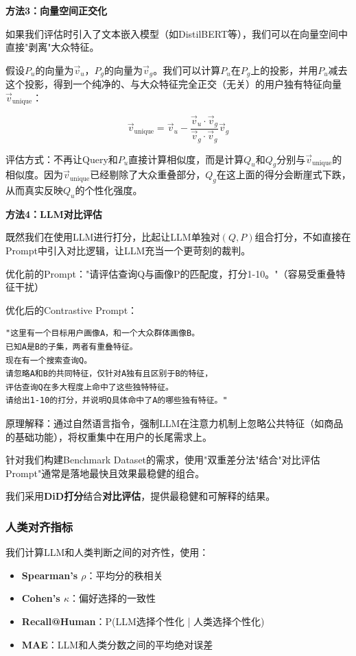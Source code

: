 \documentclass[11pt,a4paper]{article}
\begin{document}
\textbf{方法3：向量空间正交化}

如果我们评估时引入了文本嵌入模型（如DistilBERT等），我们可以在向量空间中直接"剥离"大众特征。

假设$P_u$的向量为$\vec{v}_u$，$P_g$的向量为$\vec{v}_g$。我们可以计算$P_u$在$P_g$上的投影，并用$P_u$减去这个投影，得到一个纯净的、与大众特征完全正交（无关）的用户独有特征向量$\vec{v}_{\text{unique}}$：

\begin{equation}
\vec{v}_{\text{unique}} = \vec{v}_u - \frac{\vec{v}_u \cdot \vec{v}_g}{\vec{v}_g \cdot \vec{v}_g} \vec{v}_g
\end{equation}

评估方式：不再让Query和$P_u$直接计算相似度，而是计算$Q_u$和$Q_g$分别与$\vec{v}_{\text{unique}}$的相似度。因为$\vec{v}_{\text{unique}}$已经剔除了大众重叠部分，$Q_g$在这上面的得分会断崖式下跌，从而真实反映$Q_u$的个性化强度。

\textbf{方法4：LLM对比评估}

既然我们在使用LLM进行打分，比起让LLM单独对$(Q,P)$组合打分，不如直接在Prompt中引入对比逻辑，让LLM充当一个更苛刻的裁判。

优化前的Prompt："请评估查询Q与画像P的匹配度，打分1-10。"（容易受重叠特征干扰）

优化后的Contrastive Prompt：
\begin{verbatim}
"这里有一个目标用户画像A，和一个大众群体画像B。
已知A是B的子集，两者有重叠特征。
现在有一个搜索查询Q。
请忽略A和B的共同特征，仅针对A独有且区别于B的特征，
评估查询Q在多大程度上命中了这些独特特征。
请给出1-10的打分，并说明Q具体命中了A的哪些独有特征。"
\end{verbatim}

原理解释：通过自然语言指令，强制LLM在注意力机制上忽略公共特征（如商品的基础功能），将权重集中在用户的长尾需求上。

针对我们构建Benchmark Dataset的需求，使用"双重差分法"结合"对比评估Prompt"通常是落地最快且效果最稳健的组合。

我们采用\textbf{DiD打分}结合\textbf{对比评估}，提供最稳健和可解释的结果。

\subsubsection{人类对齐指标}

我们计算LLM和人类判断之间的对齐性，使用：
\begin{itemize}
    \item \textbf{Spearman's $\rho$}：平均分的秩相关
    \item \textbf{Cohen's $\kappa$}：偏好选择的一致性
    \item \textbf{Recall@Human}：P(LLM选择个性化 | 人类选择个性化)
    \item \textbf{MAE}：LLM和人类分数之间的平均绝对误差
\end{itemize}
\end{document}
